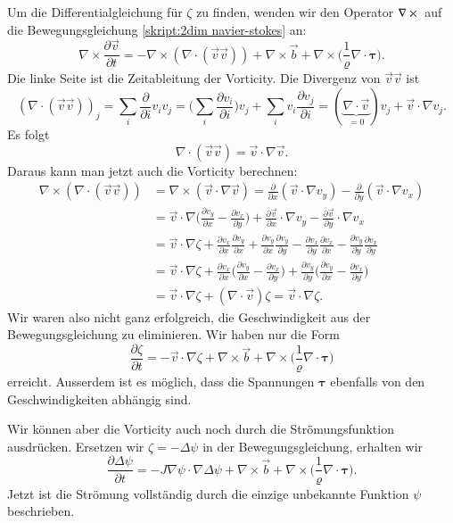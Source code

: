 Um die Differentialgleichung für $\zeta$ zu finden, wenden wir den
Operator $\nabla\times\mathstrut$ auf die Bewegungsgleichung
\eqref{skript:2dim navier-stokes}
an:
\[
\nabla\times\frac{\partial \vec{v}}{\partial t}
=
-\nabla\times(\nabla\cdot(\vec{v}\vec{v}))+\nabla\times\vec b + \nabla\times\biggl(\frac1{\varrho}\nabla\cdot\bm{\tau}\biggr).
\]
Die linke Seite ist die Zeitableitung der Vorticity.
Die Divergenz von $\vec{v}\vec{v}$ ist 
\[
(\nabla\cdot(\vec{v}\vec{v}))_j
=
\sum_i \frac{\partial}{\partial i}v_iv_j
=
\biggl(\sum_i \frac{\partial v_i}{\partial i}\biggr)v_j
+
\sum_i v_i\frac{\partial v_j}{\partial i}
=
(\underbrace{\nabla\cdot\vec{v}}_{\displaystyle=0})v_j
+
\vec{v}\cdot\nabla v_j.
\]
Es folgt
\[
\nabla\cdot(\vec{v}\vec{v})
=
\vec{v}\cdot\nabla \vec{v}.
\]
Daraus kann man jetzt auch die Vorticity berechnen:
\begin{align*}
\nabla\times(\nabla\cdot(\vec{v}\vec{v}))
&=
\nabla\times(\vec{v}\cdot\nabla\vec{v})
=
\frac{\partial}{\partial x}(\vec{v}\cdot\nabla v_y)
-
\frac{\partial}{\partial y}(\vec{v}\cdot\nabla v_x)
\\
&=
\vec{v}\cdot\nabla
\biggl(\frac{\partial v_y}{\partial x}-\frac{\partial v_x}{\partial y}\biggr)
+
\frac{\partial\vec{v}}{\partial x} \cdot\nabla v_y
-
\frac{\partial\vec{v}}{\partial y} \cdot\nabla v_x
\\
&=
\vec{v}\cdot\nabla\zeta
+
\frac{\partial v_x}{\partial x} \frac{\partial v_y}{\partial x}
+
\frac{\partial v_y}{\partial x} \frac{\partial v_y}{\partial y}
-
\frac{\partial v_x}{\partial y} \frac{\partial v_x}{\partial x}
-
\frac{\partial v_y}{\partial y} \frac{\partial v_x}{\partial y}
\\
&=
\vec{v}\cdot\nabla\zeta
+
\frac{\partial v_x}{\partial x}
\biggl(\frac{\partial v_y}{\partial x}-\frac{\partial v_x}{\partial y}\biggr)
+
\frac{\partial v_y}{\partial y}
\biggl(\frac{\partial v_y}{\partial x}-\frac{\partial v_x}{\partial y}\biggr)
\\
&=
\vec{v}\cdot\nabla\zeta
+
(\nabla\cdot\vec{v})\zeta
=
\vec{v}\cdot\nabla\zeta.
\end{align*}
Wir waren also nicht ganz erfolgreich, die Geschwindigkeit aus der
Bewegungsgleichung zu eliminieren.
Wir haben nur die Form
\[
\frac{\partial \zeta}{\partial t}
=
-\vec{v}\cdot\nabla\zeta
+\nabla\times\vec b
+ \nabla\times\biggl(\frac1{\varrho}\nabla\cdot\bm{\tau}\biggr)
\]
erreicht.
Ausserdem ist es möglich, dass die Spannungen $\bm{\tau}$ ebenfalls von
den Geschwindigkeiten abhängig sind.

Wir können aber die Vorticity auch noch durch die Strömungsfunktion
ausdrücken.
Ersetzen wir $\zeta=-\Delta\psi$ in der Bewegungsgleichung, erhalten
wir
\begin{equation}
\frac{\partial \Delta \psi}{\partial t}
=
-J\nabla\psi\cdot\nabla\Delta\psi
+\nabla\times\vec b
+ \nabla\times\biggl(\frac1{\varrho}\nabla\cdot\bm{\tau}\biggr).
\label{skript:voritictyequation}
\end{equation}
Jetzt ist die Strömung vollständig durch die einzige unbekannte Funktion 
$\psi$ beschrieben.

